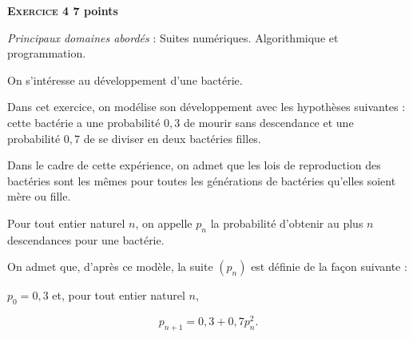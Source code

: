\documentclass[11pt]{article}
\begin{document}
\bigskip

\textbf{\textsc{Exercice 4} \hfill 7 points}

\medskip

\emph{Principaux domaines abordés} : Suites numériques.
Algorithmique et programmation.

\bigskip

On s'intéresse au développement d'une bactérie.

Dans cet exercice, on modélise son développement avec les hypothèses suivantes : cette bactérie a une probabilité $0,3$ de mourir sans descendance et une probabilité $0,7$ de se diviser en deux bactéries filles.

Dans le cadre de cette expérience, on admet que les lois de reproduction des bactéries sont les mêmes pour toutes les générations de bactéries qu'elles soient mère ou fille.

Pour tout entier naturel $n$, on appelle $p_n$ la probabilité d'obtenir au plus $n$ descendances pour une bactérie. 

On admet que, d'après ce modèle, la suite $\left(p_n\right)$ est définie de la façon suivante :

$p_0 = 0,3$ et, pour tout entier naturel $n$,

\[p_{n+1} = 0,3 + 0,7p_n^2.\]
\end{document}
